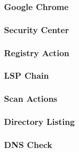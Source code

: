 \subsubsection{Google Chrome}
\subsubsection{Security Center}
\subsubsection{Registry Action}
\subsubsection{LSP Chain}
\subsubsection{Scan Actions}
\subsubsection{Directory Listing}
\subsubsection{DNS Check}